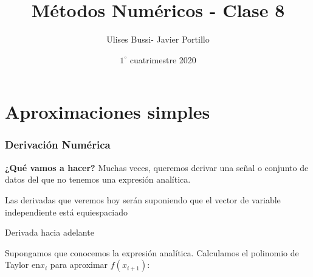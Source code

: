 \documentclass[xcolor=svgnames]{beamer} %
\title{Métodos Numéricos - Clase 8}
\author{Ulises Bussi- Javier Portillo}
\date{ $1^\circ$ cuatrimestre 2020}
\theoremstyle{plain}
\renewcommand{\textbf}[1]{{\bfseries\textcolor{redUnq2}{#1}}}
\theoremstyle{definition}
\begin{document}
 


\begin{frame} %
	\titlepage
\end{frame}

\begin{frame}
\tableofcontents
\end{frame}


\section{Aproximaciones simples}

\begin{frame}
\frametitle{Derivación Numérica}

\vspace{10pt}



\begin{tcolorbox}
\textbf{¿Qué vamos a hacer?}
Muchas veces, queremos derivar una señal o conjunto de datos del que no tenemos una expresión analítica.
\end{tcolorbox} \vspace{20pt}

\pause
Las derivadas que veremos hoy serán suponiendo que el vector de variable independiente está equiespaciado



\end{frame}


\begin{frame}{Derivada hacia adelante}
	 
 Supongamos que conocemos la expresión analítica. Calculamos el polinomio de Taylor en$x_{i}$ para aproximar $f(x_{i+1})$:\vspace{-5pt}


\visible<4->{\begin{tcolorbox}
\textbf{Derivada hacia adelante:}
	$$f'(x_i) = \frac{f(x_{i+1}) - f(x_i)}{h} $$\vspace{-20pt}
\end{tcolorbox}}
\end{frame}
\end{document}
